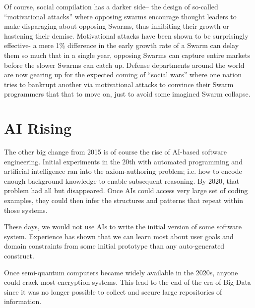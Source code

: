 \documentclass[journal]{IEEEtran}
\begin{document}
\begin{itemize}
{Of course, social compilation has a darker side--
the design of so-called ``motivational
attacks'' where opposing swarms encourage thought
leaders to make disparaging about opposing Swarms,
thus inhibiting their growth or hastening their
demise.  Motivational attacks
have been shown to be
surprisingly effective- a mere 1\% difference in the
early growth rate of a Swarm can delay them so much
that in a single year, opposing Swarms can capture
entire markets before the slower Swarms can catch
up. 
Defense departments around the world are now
gearing up for the expected coming of ``social wars''
where one nation tries to bankrupt another via
motivational attacks to convince their
Swarm programmers that that  to move on,
just to avoid some imagined Swarm collapse.

\section{AI Rising}

The other big change from 2015 is of course the rise
of AI-based software engineering. Initial
experiments in the 20th with automated programming
and artificial intelligence ran into the
axiom-authoring problem; i.e. how to encode enough
background knowledge to enable subsequent reasoning.
By 2020, that problem had all but disappeared. Once
AIs could access very large set of coding examples,
they could then infer the structures and patterns
that repeat within those systems.

These days, we would not use AIs to write the
initial version of some software system. Experience
has shown that we can learn most about user goals
and domain constraints from some initial prototype
than any auto-generated construct.






Once     
semi-quantum computers became widely available in the 2020s, anyone could
crack most encryption systems.   This lead to the end of the era of Big
Data since it was no longer possible to collect and secure large repositories
of information.

}
\end{itemize}
\end{document}
